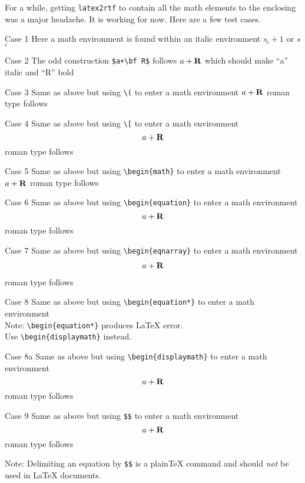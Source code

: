 \documentclass{article}
\begin{document}
For a while, getting \texttt{latex2rtf} to contain all the math elements
to the enclosing was a major headache.  It is working for now.  Here are
a few test cases.

Case 1 Here a math environment is found within an italic environment
\textit{s$_c+1$} or {\it s$_c$}

Case 2 The odd construction \verb#$a+\bf R$# follows $a+\bf R$ which
should make ``a'' italic and ``R'' bold

Case 3 Same as above but using \verb#\(# to enter a math environment
\(a+\bf R\) roman type follows

Case 4 Same as above but using \verb#\[# to enter a math environment \[a+\bf R\] 
roman type follows

Case 5 Same as above but using \verb#\begin{math}# to enter a math environment
\begin{math}a+\bf R\end{math} roman type follows

Case 6 Same as above but using \verb#\begin{equation}# to enter a math environment
\begin{equation}a+ \bf R\end{equation} roman type follows

Case 7 Same as above but using \verb#\begin{eqnarray}# to enter a math environment
\begin{eqnarray}a+ \bf R\end{eqnarray} roman type follows

Case 8 Same as above but using \verb#\begin{equation*}# to enter a math environment \\
Note: \verb#\begin{equation*}# produces LaTeX error.\\
Use \verb#\begin{displaymath}# instead.

Case 8a Same as above but using \verb#\begin{displaymath}# to enter a math environment
\begin{displaymath}a+ \bf R\end{displaymath} roman type follows

Case 9 Same as above but using \verb#$$# to enter a math environment
$$a+ \bf R$$ roman type follows

Note: Delimiting an equation by \verb|$$| is a plain\TeX{} command and
should \emph{not} be used in \LaTeX{} documents.
\end{document}
